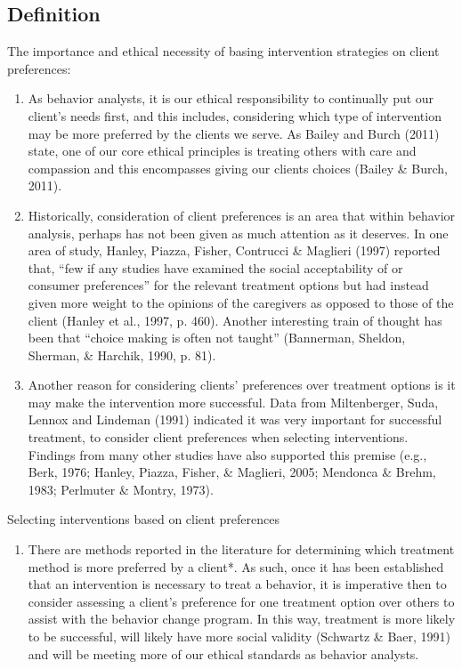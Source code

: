 \subsection{Definition}
The importance and ethical necessity of basing intervention strategies on client preferences:
\begin{enumerate}
\item As behavior analysts, it is our ethical responsibility to continually put our client's needs first, and this includes, considering which type of intervention may be more preferred by the clients we serve. As Bailey and Burch (2011) state, one of our core ethical principles is treating others with care and compassion and this encompasses giving our clients choices (Bailey \& Burch, 2011).
%
\item Historically, consideration of client preferences is an area that within behavior analysis, perhaps has not been given as much attention as it deserves. In one area of study, Hanley, Piazza, Fisher, Contrucci \& Maglieri (1997) reported that, ``few if any studies have examined the social acceptability of or consumer preferences'' for the relevant treatment options but had instead given more weight to the opinions of the caregivers as opposed to those of the client (Hanley et al., 1997, p. 460). Another interesting train of thought has been that ``choice making is often not taught'' (Bannerman, Sheldon, Sherman, \& Harchik, 1990, p. 81).
%
\item Another reason for considering clients' preferences over treatment options is it may make the intervention more successful. Data from Miltenberger, Suda, Lennox and Lindeman (1991) indicated it was very important for successful treatment, to consider client preferences when selecting interventions. Findings from many other studies have also supported this premise (e.g., Berk, 1976; Hanley, Piazza, Fisher, \& Maglieri, 2005; Mendonca \& Brehm, 1983; Perlmuter \& Montry, 1973).
\end{enumerate}

Selecting interventions based on client preferences 
\begin{enumerate}
\item There are methods reported in the literature for determining which treatment method is more preferred by a client*. As such, once it has been established that an intervention is necessary to treat a behavior, it is imperative then to consider assessing a client's preference for one treatment option over others to assist with the behavior change program. In this way, treatment is more likely to be successful, will likely have more social validity (Schwartz \& Baer, 1991) and will be meeting more of our ethical standards as behavior analysts.
\end{enumerate}
%
